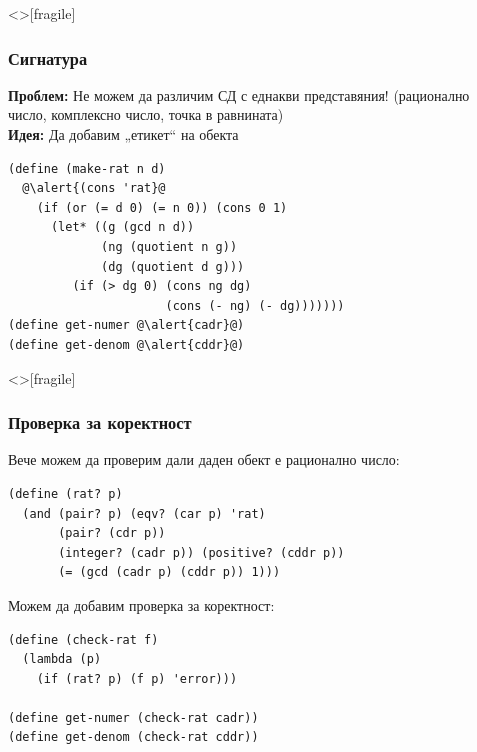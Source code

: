 \documentclass[alsotrans,beameroptions={aspectratio=169}]{beamerswitch}
\begin{document}
\begin{frame}<>[fragile]
  \frametitle{Сигнатура}

  \sizeboth\footnotesize
  \textbf{Проблем:} Не можем да различим СД с еднакви представяния! (рационално число, комплексно число, точка в равнината)\\
  \pause
  \textbf{Идея:} Да добавим „етикет“ на обекта
  \begin{center}
  \end{center}
  \pause
  \vspace{-.5ex}
\begin{lstlisting}
(define (make-rat n d)
  @\alert{(cons 'rat}@
    (if (or (= d 0) (= n 0)) (cons 0 1)
      (let* ((g (gcd n d))
             (ng (quotient n g))
             (dg (quotient d g)))
         (if (> dg 0) (cons ng dg)
                      (cons (- ng) (- dg)))))))
(define get-numer @\alert{cadr}@)
(define get-denom @\alert{cddr}@)
\end{lstlisting}
\end{frame}

\begin{frame}<>[fragile]
  \frametitle{Проверка за коректност}

  Вече можем да проверим дали даден обект е рационално число:
\begin{lstlisting}
(define (rat? p)
  (and (pair? p) (eqv? (car p) 'rat)
       (pair? (cdr p))
       (integer? (cadr p)) (positive? (cddr p))
       (= (gcd (cadr p) (cddr p)) 1)))
\end{lstlisting}
  \pause
  Можем да добавим проверка за коректност:
\begin{lstlisting}
(define (check-rat f)
  (lambda (p)
    (if (rat? p) (f p) 'error)))

(define get-numer (check-rat cadr))
(define get-denom (check-rat cddr))
\end{lstlisting}
\end{frame}

\end{document}

